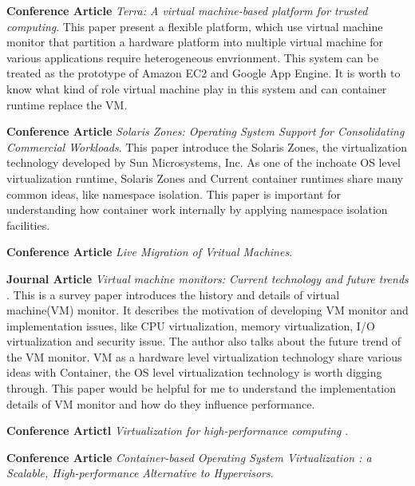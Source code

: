 \documentclass{article}
\begin{document}
\medskip

\textbf{Conference Article} \emph{Terra: A virtual machine-based platform for trusted 
computing}\cite{garfinkel2003terra}. This paper present a flexible platform, which use virtual 
machine monitor that partition a hardware platform into multiple virtual machine for various
applications require heterogeneous envrionment. This system can be treated as the prototype of
Amazon EC2 and Google App Engine. It is worth to know what kind of role virtual machine play in 
this system and can container runtime replace the VM.

\medskip

\textbf{Conference Article} \emph{Solaris Zones: Operating System Support for Consolidating 
Commercial Workloads}\cite{price2004solaris}. This paper introduce the Solaris Zones, the 
virtualization technology developed by Sun Microsystems, Inc. As one of the inchoate OS 
level virtualization runtime, Solaris Zones and Current container runtimes share many common 
ideas, like namespace isolation. This paper is important for understanding how container 
work internally by applying namespace isolation facilities.

\medskip

\textbf{Conference Article} \emph{Live Migration of Vritual Machines}\cite{clark2005live}.

\medskip

\textbf{Journal Article} \emph{Virtual machine monitors: Current technology and future trends}
\cite{rosenblum2005virtual}. This is a survey paper introduces the history and details of virtual 
machine(VM) monitor. It describes the motivation of developing VM monitor and implementation 
issues, like CPU virtualization, memory virtualization, I/O virtualization and security issue. The
author also talks about the future trend of the VM monitor. VM as a hardware level virtualization
technology share various ideas with Container, the OS level virtualization technology is worth 
digging through. This paper would be helpful for me to understand the implementation details of VM 
monitor and how do they influence performance.

\medskip

\textbf{Conference Artictl} \emph{Virtualization for high-performance computing}
\cite{mergen2006virtualization}.

\medskip

\textbf{Conference Article} \emph{Container-based Operating System Virtualization
: a Scalable, High-performance Alternative to Hypervisors}\cite{soltesz2007container}.
\end{document}
